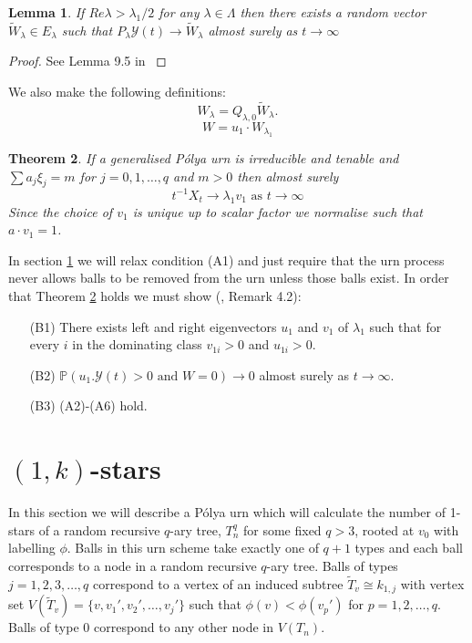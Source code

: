 \documentclass[12pt]{article} %
\newtheorem{thm}{Theorem}[section]
\newtheorem{lem}[thm]{Lemma}
\theoremstyle{definition}
\begin{document}
\begin{lem}\label{lemlam}
 If $Re{\lambda} > \lambda_{1}/2$ for any $\lambda \in \Lambda$ then there exists a random vector $\tilde{W}_{\lambda} \in E_{\lambda}$ such that $P_{\lambda}\mathcal{Y}(t) \rightarrow \tilde{W}_{\lambda}$ almost surely as $t \rightarrow\infty$ %
\end{lem}
\begin{proof}
 See Lemma 9.5 in \cite{JansonSPATA}
\end{proof}
We also make the following definitions:
\begin{equation}
 W_{\lambda} = Q_{\lambda,0}\tilde{W}_{\lambda}.
\end{equation}
\begin{equation}
 W = u_{1} \cdot W_{\lambda_{1}}
\end{equation}

 \begin{thm}\label{th1}\cite{Janson}
 If a generalised P\'{o}lya urn is irreducible and tenable and $\sum a_{j}\xi_{j} = m$ for $j = 0,1,\dots,q$ and $m >0$ then almost surely
 \[t^{-1}X_{t} \rightarrow \lambda_{1}v_{1} \text{    as   } t \rightarrow\infty\]
 Since the choice of $v_{1}$ is unique up to scalar factor we normalise such that $a \cdot v_{1} = 1$. 
\end{thm}

In section \ref{onestars} we will relax condition (A1) and just require that the urn process never allows balls to be removed from the urn unless those balls exist. %
In  order that Theorem \ref{th1} holds we must show (\cite{JansonSPATA}, Remark 4.2):
\begin{itemize}
 \item[ (B1)] There exists left and right eigenvectors $u_{1}$ and $v_{1}$ of $\lambda_{1}$ such that for every $i$ in the dominating class $v_{1i} > 0$ and $u_{1i}>0$.
 \item[(B2)] $\mathbb{P}(u_{1}.\mathcal{Y}(t) > 0 \text{  and  } W = 0) \rightarrow 0$ almost surely as $t \rightarrow \infty.$
 \item[(B3)] (A2)-(A6) hold.
\end{itemize}

\section{$(1,k)$-stars}\label{onestars}
 
 
 
 In this section we will describe a P\'{o}lya urn which will calculate the number of 1-stars of a random recursive $q$-ary tree, $T_{n}^{q}$ for some fixed $q >3$, rooted at $v_{0}$ with labelling  $\phi$.  Balls in this urn scheme take exactly one of $q+1$ types and each ball corresponds to a node in a random recursive $q$-ary tree. Balls of types $j = 1,2,3,\dots,q$ correspond to a vertex of an induced subtree $\tilde{T}_{v}\cong k_{1,j}$ with vertex set $V(\tilde{T}_{v}) = \{ v,v_{1}',v_{2}',\dots,v_{j}'\}$ such that $\phi(v) < \phi(v_{p}') $ for $p = 1,2,\dots,q$. Balls of type 0 correspond to any other node in $V(T_{n})$. 
 
\end{document}
